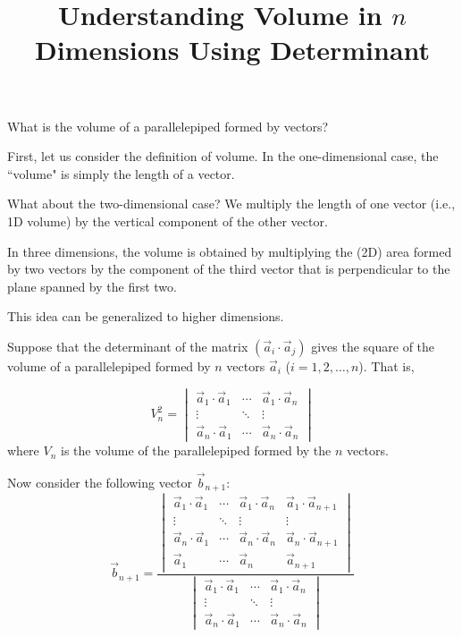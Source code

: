 \documentclass[letterpaper, 12pt]{article}
\title{Understanding Volume in $n$ Dimensions Using Determinant}
\date{}
\theoremstyle{custom}
\begin{document}
\maketitle
What is the volume of a parallelepiped formed by vectors?

First, let us consider the definition of volume.
In the one-dimensional case, the ``volume" is simply the length of a vector.

What about the two-dimensional case?
We multiply the length of one vector (i.e., 1D volume) by the vertical component of the other vector.

In three dimensions, the volume is obtained by multiplying the (2D) area formed by two vectors by the component of the third vector that is perpendicular to the plane spanned by the first two.

This idea can be generalized to higher dimensions.

Suppose that the determinant of the matrix $(\vec{a}_i \cdot \vec{a}_j)$ gives the square of the volume of a parallelepiped formed by $n$ vectors $\vec{a}_i$ ($i = 1, 2, \ldots, n$). That is,

\begin{equation*}
  V_n^2 = 
  \begin{vmatrix}
    \vec{a}_1 \cdot \vec{a}_1 & \cdots & \vec{a}_1 \cdot \vec{a}_n \\
    \vdots & \ddots &  \vdots \\
    \vec{a}_n \cdot \vec{a}_1 & \cdots & \vec{a}_n \cdot \vec{a}_n
  \end{vmatrix}
\end{equation*}
where $V_n$ is the volume of the parallelepiped formed by the $n$ vectors.

Now consider the following vector $\vec{b}_{n+1}$:
\begin{equation*}
  \vec{b}_{n+1} = \frac{
    \begin{vmatrix}
    \vec{a}_1 \cdot \vec{a}_1 & \cdots & \vec{a}_1 \cdot \vec{a}_n & \vec{a}_1 \cdot \vec{a}_{n+1} \\
    \vdots & \ddots &  \vdots & \vdots\\
    \vec{a}_n \cdot \vec{a}_1 & \cdots & \vec{a}_n \cdot \vec{a}_n & \vec{a}_n \cdot \vec{a}_{n+1}\\
    \vec{a}_1 & \cdots & \vec{a}_n & \vec{a}_{n+1}
    \end{vmatrix}
  }
  {
  \begin{vmatrix}
    \vec{a}_1 \cdot \vec{a}_1 & \cdots & \vec{a}_1 \cdot \vec{a}_n \\
    \vdots & \ddots &  \vdots \\
    \vec{a}_n \cdot \vec{a}_1 & \cdots & \vec{a}_n \cdot \vec{a}_n
  \end{vmatrix}
  }
\end{equation*}
\end{document}
